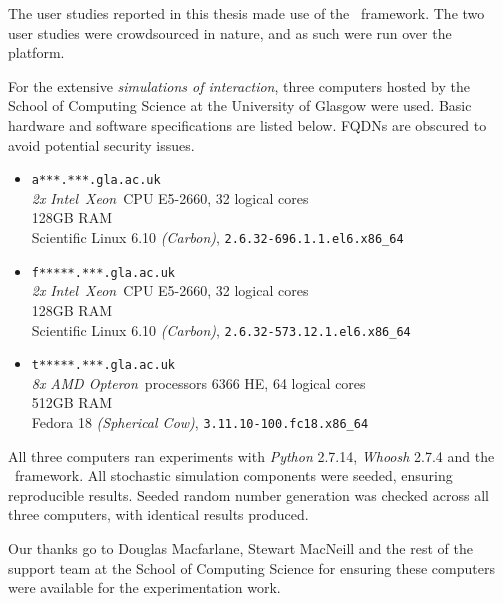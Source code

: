 
\begin{preamble}
{}

The user studies reported in this thesis made use of the \treconomics~framework. The two user studies were crowdsourced in nature, and as such were run over the~ platform.

For the extensive \emph{simulations of interaction}, three computers hosted by the School of Computing Science at the University of Glasgow were used. Basic hardware and software specifications are listed below. FQDNs are obscured to avoid potential security issues.

\begin{itemize}
    
    \item{\texttt{a***.***.gla.ac.uk}\\\emph{2x} \emph{Intel}\textregistered~\emph{Xeon}\textregistered~CPU E5-2660, 32 logical cores\\128GB RAM\\Scientific Linux 6.10 \emph{(Carbon)}, \texttt{2.6.32-696.1.1.el6.x86\_64}}
    
    \item{\texttt{f*****.***.gla.ac.uk}\\\emph{2x} \emph{Intel}\textregistered~\emph{Xeon}\textregistered~CPU E5-2660, 32 logical cores\\128GB RAM\\Scientific Linux 6.10 \emph{(Carbon)}, \texttt{2.6.32-573.12.1.el6.x86\_64}}
    
    \item{\texttt{t*****.***.gla.ac.uk}\\\emph{8x} \emph{AMD Opteron}\texttrademark~processors 6366 HE, 64 logical cores\\512GB RAM\\Fedora 18 \emph{(Spherical Cow)}, \texttt{3.11.10-100.fc18.x86\_64}}
    
\end{itemize}

All three computers ran experiments with \emph{Python} 2.7.14, \emph{Whoosh} 2.7.4 and the \simiir~framework. All stochastic simulation components were seeded, ensuring reproducible results. Seeded random number generation was checked across all three computers, with identical results produced.

Our thanks go to Douglas Macfarlane, Stewart MacNeill and the rest of the support team at the School of Computing Science for ensuring these computers were available for the experimentation work.
\end{preamble}

\newpage
\thispagestyle{empty}
\mbox{}
\newpage
\thispagestyle{empty}
\mbox{}
\newpage
\mbox{}